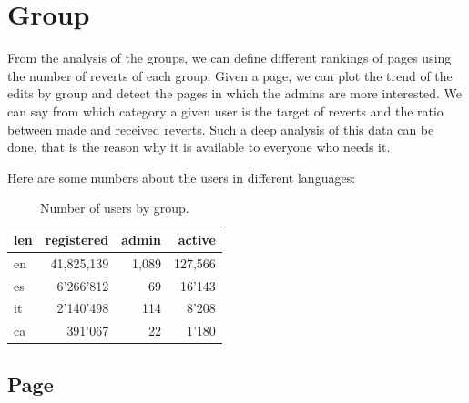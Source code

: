\section{Group}
From the analysis of the groups, we can define different rankings of pages using the number of
reverts of each group. Given a page, we can plot the trend of the edits by group and detect the
pages in which the admins are more interested. We can say from which category a given user
is the target of reverts and the ratio between made and received reverts. Such a deep analysis of
this data can be done, that is the reason why it is available to everyone who needs it. 

Here are some numbers about the users in different languages:
\begin{table}[H]
    \centering
    \begin{tabularx}{\columnwidth}{@{}Xrrr@{}}
        \midrule
        \textbf{len}& \textbf{registered} & \textbf{admin}& \textbf{active}  \\ \toprule
        en& 41,825,139& 1,089& 127,566  \\
        es & 6'266'812 & 69 & 16'143   \\
        it & 2'140'498 & 114 & 8'208\\
        ca & 391'067 & 22 & 1'180   \\
     


         \bottomrule
    \end{tabularx}
    
    \caption{Number of users by group. \label{table:statsuser}}
\end{table}

\subsection{Page}
